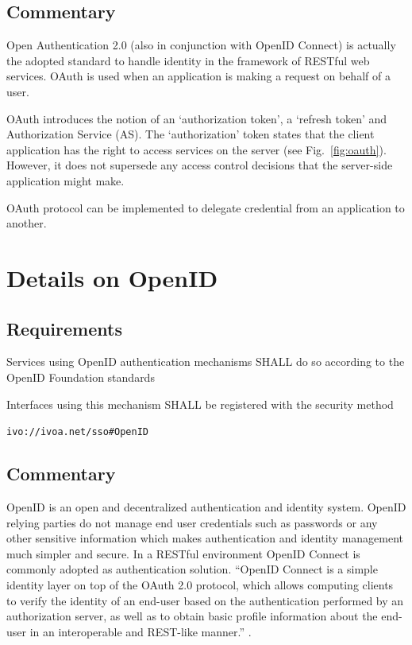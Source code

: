 \documentclass[11pt,a4paper]{ivoa}
\begin{document}
{{{\subsection{Commentary}
Open Authentication 2.0 (also in conjunction with OpenID Connect) is actually the adopted standard
to handle identity in the framework of RESTful web services.
OAuth is used when an application is making a request on behalf of a user.

OAuth introduces the notion of an `authorization token', a `refresh token' and Authorization Service (AS).
The `authorization' token states that the client application has the right to access services on the server  (see Fig.~\ref{fig:oauth}).
However, it does not supersede any access control decisions that the server-side application might make.

OAuth protocol can be implemented  to delegate credential from an application to another.

\section{Details on OpenID}
\subsection{Requirements}
Services using OpenID authentication mechanisms SHALL do so according to the OpenID Foundation standards \citep{std:openid}

Interfaces using this mechanism SHALL  be registered with the security method

\texttt{ivo://ivoa.net/sso\#OpenID}


\subsection{Commentary}
OpenID is an open and decentralized authentication and identity system. OpenID relying parties do not manage end user credentials
such as passwords or any other sensitive information which makes authentication and identity management much simpler and secure.
In a RESTful environment OpenID Connect \citep{std:openidconnect} is commonly adopted as authentication solution. ``OpenID Connect  is a simple identity
layer on top of the OAuth 2.0 protocol, which allows computing clients to verify the identity of an end-user based on the authentication
 performed by an authorization server, as well as to obtain basic profile information about the end-user in an interoperable and REST-like manner.'' \citep{std:openid}.

}}}
\end{document}
